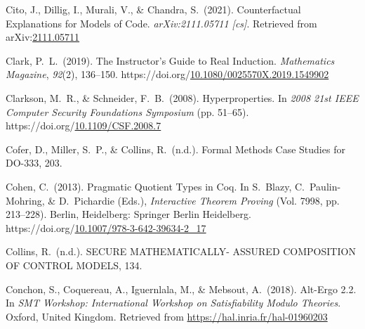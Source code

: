 \documentclass[12pt,twoside]{article}
\begin{document}
{\begin{thebibliography}{1079}
\mdbibitemlabel{}Cito, J., Dillig, I., Murali, V., \& Chandra, S.~(2021). Counterfactual Explanations for Models of Code. \emph{arXiv:2111.05711 {}[cs]}. Retrieved from arXiv:\href{http://arxiv.org/abs/2111.05711}{2111.05711}%

\mdbibitemlabel{}Clark, P.~L.~(2019). The Instructor’s Guide to Real Induction. \emph{Mathematics Magazine}, \emph{92}(2), 136–150. https://doi.org/\href{https://dx.doi.org/10.1080/0025570X.2019.1549902}{10.1080/0025570X.2019.1549902}%

\mdbibitemlabel{}Clarkson, M.~R., \& Schneider, F.~B.~(2008). Hyperproperties. In \emph{2008 21st IEEE Computer Security Foundations Symposium} (pp. 51–65). https://doi.org/\href{https://dx.doi.org/10.1109/CSF.2008.7}{10.1109/CSF.2008.7}%

\mdbibitemlabel{}Cofer, D., Miller, S.~P., \& Collins, R.~(n.d.). Formal Methods Case Studies for DO-333, 203.%

\mdbibitemlabel{}Cohen, C.~(2013). Pragmatic Quotient Types in Coq. In S.~Blazy, C.~Paulin-Mohring, \& D.~Pichardie (Eds.), \emph{Interactive Theorem Proving} (Vol. 7998, pp. 213–228). Berlin, Heidelberg: Springer Berlin Heidelberg. https://doi.org/\href{https://dx.doi.org/10.1007/978-3-642-39634-2_17}{10.1007/978-3-642-39634-2\_17}%

\mdbibitemlabel{}Collins, R.~(n.d.). SECURE MATHEMATICALLY- ASSURED COMPOSITION OF CONTROL MODELS, 134.%

\mdbibitemlabel{}Conchon, S., Coquereau, A., Iguernlala, M., \& Mebsout, A.~(2018). Alt-Ergo 2.2. In \emph{SMT Workshop: International Workshop on Satisfiability Modulo Theories}. Oxford, United Kingdom. Retrieved from \href{https://hal.inria.fr/hal-01960203}{{\ttfamily https://\hspace{0pt}hal.\hspace{0pt}inria.\hspace{0pt}fr/\hspace{0pt}hal-\hspace{0pt}01960203}}%


\end{thebibliography}}
\end{document}
